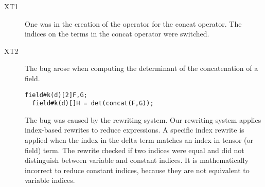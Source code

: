 \begin{description}
\item[XT1]
One was in the creation of the \name{}  operator for the concat operator.
The indices on the terms in the concat \name{} operator were switched.
\item[XT2]
The bug arose when computing the determinant of the concatenation of a field.
\begin{lstlisting}[mathescape=true]
  field#k(d)[2]F,G;
  field#k(d)[]H = det(concat(F,G));
\end{lstlisting}
The bug was caused by the rewriting system.
Our rewriting system applies index-based rewrites to reduce \name{} expressions. 
A specific index rewrite is applied when the index in the delta term matches an index in tensor (or field)  term.
The rewrite checked if two indices were equal and did not distinguish between variable and constant indices.
It is mathematically incorrect to reduce constant indices, because they are not equivalent to variable indices.
\end{description}